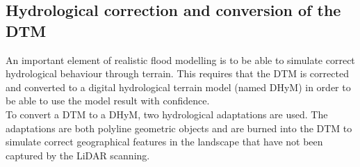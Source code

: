 \subsection{Hydrological correction and conversion of the DTM}
An important element of realistic flood modelling is to be able to simulate correct hydrological behaviour through terrain. This requires that the DTM is corrected and converted to a digital hydrological terrain model (named DHyM) in order to be able to use the model result with confidence.\\

To convert a DTM to a DHyM, two hydrological adaptations are used. The adaptations are both polyline geometric objects and are burned into the DTM to simulate correct geographical features in the landscape that have not been captured by the LiDAR scanning.\\


